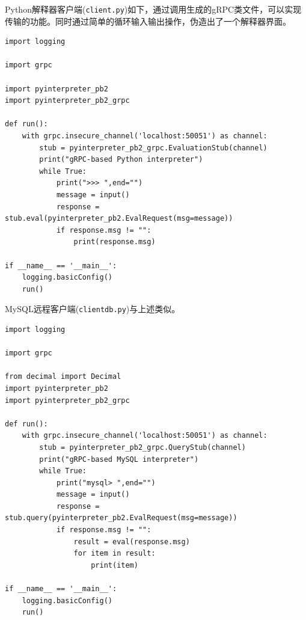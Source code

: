 \documentclass[logo,reportComp]{thesis}
\begin{document}
Python解释器客户端(\verb'client.py')如下，通过调用生成的gRPC类文件，可以实现传输的功能。同时通过简单的循环输入输出操作，伪造出了一个解释器界面。
\begin{lstlisting}
import logging

import grpc

import pyinterpreter_pb2
import pyinterpreter_pb2_grpc

def run():
	with grpc.insecure_channel('localhost:50051') as channel:
		stub = pyinterpreter_pb2_grpc.EvaluationStub(channel)
		print("gRPC-based Python interpreter")
		while True:
			print(">>> ",end="")
			message = input()
			response = stub.eval(pyinterpreter_pb2.EvalRequest(msg=message))
			if response.msg != "":
				print(response.msg)

if __name__ == '__main__':
	logging.basicConfig()
	run()
\end{lstlisting}

MySQL远程客户端(\verb'clientdb.py')与上述类似。
\begin{lstlisting}
import logging

import grpc

from decimal import Decimal
import pyinterpreter_pb2
import pyinterpreter_pb2_grpc

def run():
	with grpc.insecure_channel('localhost:50051') as channel:
		stub = pyinterpreter_pb2_grpc.QueryStub(channel)
		print("gRPC-based MySQL interpreter")
		while True:
			print("mysql> ",end="")
			message = input()
			response = stub.query(pyinterpreter_pb2.EvalRequest(msg=message))
			if response.msg != "":
				result = eval(response.msg)
				for item in result:
					print(item)

if __name__ == '__main__':
	logging.basicConfig()
	run()
\end{lstlisting}
\end{document}
